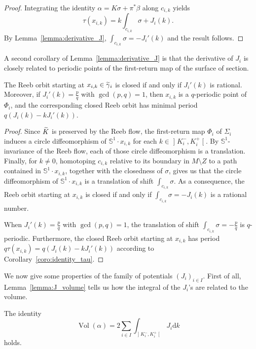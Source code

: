 \documentclass[AHL,Unicode,longabstracts]{cedram}
\DeclareMathOperator{\vol}{Vol}
\newcommand{\bbS}{\mathbb{S}}
\newcommand{\rmd}{\mathrm{d}}
\let\oldtilde\tilde
\renewcommand*{\tilde}[1]{\mathchoice{\widetilde{#1}}{\widetilde{#1}}{\oldtilde{#1}}{\oldtilde{#1}}}
\newcommand{\bbS}{\mathbb{S}}
\begin{document}
\begin{proof}
Integrating the identity $\alpha = K \sigma + \pi ^* \beta$ along $c_{i,k}$ yields
\[
\tau(x_{i,k}) = k \int_{c_{i,k}}\sigma + J_i(k).
\]
By Lemma~\ref{lemma:derivative_J}, $\int_{c_{i,k}}\sigma = - J_i'(k)$ and the result follows.
\end{proof}

A second corollary of Lemma~\ref{lemma:derivative_J} is that the derivative of $J_i$ is closely related to periodic points of the first-return map of the surface of section.

\begin{coro}\label{coro:periodic_point}
The Reeb orbit starting at $x_{i,k} \in \tilde \gamma_i$ is closed if and only if $J_i'(k)$ is rational. Moreover, if $J_i'(k) = \frac{p}{q}$ with $\gcd(p,q)=1$, then $x_{i,k}$ is a $q$-periodic point of $\Phi_i$, and the corresponding closed Reeb orbit has minimal period $q(J_i(k) - k J_i'(k))$.
\end{coro}

\begin{proof}
Since $\tilde K$ is preserved by the Reeb flow, the first-return map $\Phi_i$ of $\Sigma_i$ induces a circle diffeomorphism of $\bbS^1 \cdot x_{i,k}$ for each $k \in\mathopen{]}K_i^-, K_i^+\mathclose{[}$. By $\bbS^1$-invariance of the Reeb flow, each of those circle diffeomorphism is a translation. Finally, for $k \neq 0$, homotoping $c_{i,k}$ relative to its boundary in $M \setminus Z$ to a path contained in $\bbS^1 \cdot x_{i,k}$, together with the closedness of $\sigma$, gives us that the circle diffeomorphism of $\bbS^1 \cdot x_{i,k}$ is a translation of shift $\int_{c_{i,k}} \sigma$. As a consequence, the Reeb orbit starting at $x_{i,k}$ is closed if and only if $\int_{c_{i,k}} \sigma = -J_i(k)$ is a rational number.

When $J_i'(k) = \frac{p}{q}$ with $\gcd(p,q)=1$, the translation of shift $\int_{c_{i,k}} \sigma = - \frac{p}{q}$ is $q$-periodic. Furthermore, the closed Reeb orbit starting at $x_{i,k}$ has period $q \tau(x_{i,k}) = q(J_i(k) - k J_i'(k))$ according to Corollary~\ref{coro:identity_tau}.
\end{proof}

We now give some properties of the family of potentials $(J_i)_{i \in I}$. First of all, Lemma~\ref{lemma:J_volume} tells us how the integral of the $J_i$'s are related to the volume.

\begin{lemm}\label{lemma:J_volume}
The identity
\[
\vol(\alpha) = 2 \sum_{i \in I} \int_{\mathopen{]}K_i^-, K_i^+\mathclose{[}}J_i \rmd k
\]
holds.
\end{lemm}
\end{document}
